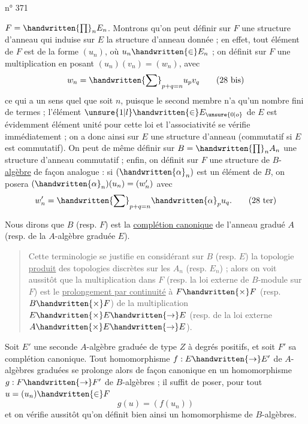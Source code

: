 \begin{flushright}n° 371\end{flushright}

$F=\handwritten{\prod}_{n}E_n$. Montrons qu'on peut définir sur $F$ une structure d'anneau qui induise sur $E$ la structure d'anneau donnée ; en effet, tout élément de $F$ est de la forme $(u_n)$, où $u_n\handwritten{\in}E_n$ ; on définit sur $F$ une multiplication en posant $(u_n)(v_n)=(w_n)$, avec
\[
w_n=\handwritten{\sum}_{p+q=n}u_pv_q
\tag*{(28 bis)}
\]
ce qui a un sens quel que soit $n$, puisque le second membre n'a qu'un nombre fini de termes ; l'élément $\unsure{1|l}\handwritten{\in}E_{\unsure{0|o}}$ de $E$ est évidemment élément unité pour cette loi et l'associativité se vérifie immédiatement ; on a donc ainsi sur $E$ une structure d'anneau (commutatif si $E$ est commutatif). On peut de même définir sur $B=\handwritten{\prod}_{n}A_n$ une structure d'anneau commutatif ; enfin, on définit sur $F$ une structure de $B$-\uline{algèbre} de façon analogue : si $(\handwritten{\alpha}_n)$ est un élément de $B$, on posera $(\handwritten{\alpha}_n)(u_n)=(w'_n)$ avec
\[
w'_n=\handwritten{\sum}_{p+q=n}\handwritten{\alpha}_pu_q.
\tag*{(28 ter)}
\]

Nous dirons que $B$ (resp. $F$) est la \uline{complétion canonique} de l'anneau gradué $A$ (resp. de la $A$-algèbre graduée $E$).

\begin{quote}
\handwritten{*}Cette terminologie se justifie en considérant sur $B$ (resp. $E$) la topologie \uline{produit} des topologies discrètes sur les $A_n$ (resp. $E_n$) ; alors on voit aussitôt que la multiplication dans $F$ (resp. la loi externe de $B$-module sur $F$) est le \uline{prolongement par continuité} à $F\handwritten{\times}F$ (resp. $B\handwritten{\times}F$) de la multiplication $E\handwritten{\times}E\handwritten{\to}E$ (resp. de la loi externe $A\handwritten{\times}E\handwritten{\to}E$).\handwritten{*}
\end{quote}

Soit $E'$ une seconde $A$-algèbre graduée de type $Z$ à degrés positifs, et soit $F'$ sa complétion canonique. Tout homomorphisme $f:E\handwritten{\to}E'$ de $A$-algèbres graduées se prolonge alors de façon canonique en un homomorphisme $g:F\handwritten{\to}F'$ de $B$-algèbres ; il suffit de poser, pour tout $u=(u_n)\handwritten{\in}F$
\[
g(u)=(f(u_n))
\]
et on vérifie aussitôt qu'on définit bien ainsi un homomorphisme de $B$-algèbres.
